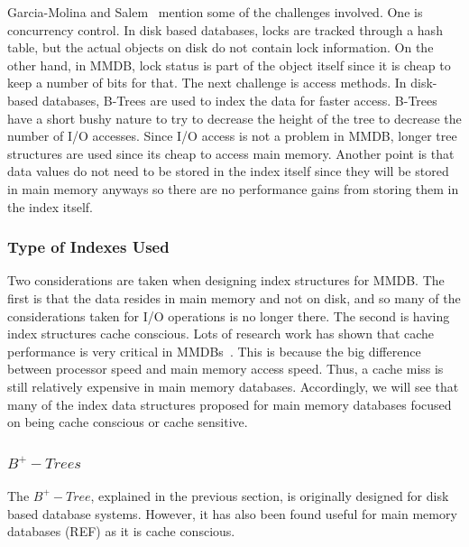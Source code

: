 \documentclass[12pt,a4paper]{article}
\begin{document}
Garcia-Molina and Salem~\cite{garcia1992main} mention some of the challenges involved. One is concurrency control. In disk based databases, locks are tracked through a hash table, but the actual objects on disk do not contain lock information. On the other hand, in MMDB, lock status is part of the object itself since it is cheap to keep a number of bits for that. The next challenge is access methods. In disk-based databases, B-Trees are used to index the data for faster access. B-Trees have a short bushy nature to try to decrease the height of the tree to decrease the number of I/O accesses. Since I/O access is not a problem in MMDB, longer tree structures are used since its cheap to access main memory. Another point is that data values do not need to be stored in the index itself since they will be stored in main memory anyways so there are no performance gains from storing them in the index itself. 

\subsubsection{Type of Indexes Used}

Two considerations are taken when designing index structures for MMDB. The first is that the data resides in main memory and not on disk, and so many of the considerations taken for I/O operations is no longer there. The second is having index structures cache conscious. Lots of research work has shown that cache performance is very critical in MMDBs~\cite{rao1999cache, boncz1999database}. This is because the big difference between processor speed and main memory access speed. Thus, a cache miss is still relatively expensive in main memory databases. Accordingly, we will see that many of the index data structures proposed for main memory databases focused on being cache conscious or cache sensitive.

\subsubsection*{$B^{+}-Trees$}
The $B^{+}-Tree$, explained in the previous section, is originally designed for disk based database systems. However, it has also been found useful for main memory databases (REF) as it is cache conscious.
\end{document}
